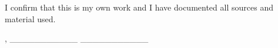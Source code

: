 \thispagestyle{empty}
\vspace*{0.8\textheight}
\noindent
I confirm that this \MakeLowercase{\getDoctype{}} is my own work and I have documented all sources and material used.

\vspace{15mm}
\noindent
\getSubmissionLocation{}, \_\_\_\_\_\_\_\_\_\_\_ \hfill \getAuthor{} \_\_\_\_\_\_\_\_\_\_\_

\cleardoublepage{}
